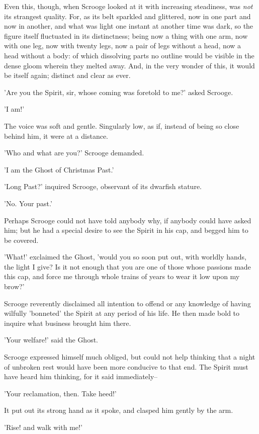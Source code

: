 Even this, though, when Scrooge looked at it with increasing steadiness,
was \emph{not} its strangest quality. For, as its belt sparkled and
glittered, now in one part and now in another, and what was light one
instant at another time was dark, so the figure itself fluctuated in its
distinctness; being now a thing with one arm, now with one leg, now with
twenty legs, now a pair of legs without a head, now a head without a
body: of which dissolving parts no outline would be visible in the dense
gloom wherein they melted away. And, in the very wonder of this, it
would be itself again; distinct and clear as ever.

'Are you the Spirit, sir, whose coming was foretold to me?' asked
Scrooge.

'I am!'

The voice was soft and gentle. Singularly low, as if, instead of being
so close behind him, it were at a distance.

'Who and what are you?' Scrooge demanded.

'I am the Ghost of Christmas Past.'

'Long Past?' inquired Scrooge, observant of its dwarfish stature.

'No. Your past.'

Perhaps Scrooge could not have told anybody why, if anybody could have
asked him; but he had a special desire to see the Spirit in his cap,
and begged him to be covered.

'What!' exclaimed the Ghost, 'would you so soon put out, with worldly
hands, the light I give? Is it not enough that you are one of those
whose passions made this cap, and force me through whole trains of years
to wear it low upon my brow?'

Scrooge reverently disclaimed all intention to offend or any knowledge
of having wilfully 'bonneted' the Spirit at any period of his life. He
then made bold to inquire what business brought him there.

'Your welfare!' said the Ghost.

Scrooge expressed himself much obliged, but could not help thinking that
a night of unbroken rest would have been more conducive to that end. The
Spirit must have heard him thinking, for it said immediately--

'Your reclamation, then. Take heed!'

It put out its strong hand as it spoke, and clasped him gently by the
arm.

'Rise! and walk with me!'

